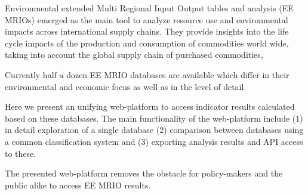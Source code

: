 Environmental extended Multi Regional Input Output tables and analysis (EE MRIOs) emerged as the main tool to analyze resource use and environmental impacts across international supply chains. They provide insights into the life cycle impacts of the production and consumption of commodities world wide, taking into account the global supply chain of purchased commodities,

Currently half a dozen EE MRIO databases are available which differ in their environmental and economic focus as well as in the level of detail.

Here we present an unifying web-platform to access indicator results calculated based on these databases. The main functionality of the web-platform include (1) in detail exploration of a single database (2) comparison between databases using a common classification system and (3) exporting analysis results and API access to these.

The presented web-platform removes the obstacle for policy-makers and the public alike to access EE MRIO results. 
